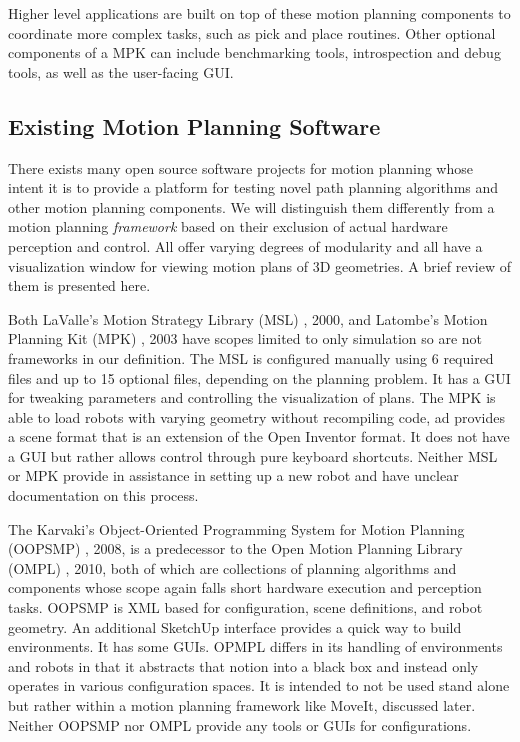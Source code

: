 \documentclass[10pt,journal,compsoc]{joser1}
\begin{document}
{Higher level applications are built on top of these motion planning components to coordinate more complex tasks, such as pick and place routines. Other optional components of a MPK can include benchmarking tools, introspection and debug tools, as well as the user-facing GUI.

\subsection{Existing Motion Planning Software}
\label{sec::existing}

There exists many open source software projects for motion planning whose intent it is to provide a platform for testing novel path planning algorithms and other motion planning components. We will distinguish them differently from a motion planning \textit{framework} based on their exclusion of actual hardware perception and control. All offer varying degrees of modularity and all have a visualization window for viewing motion plans of 3D geometries. A brief review of them is presented here.

Both LaValle's Motion Strategy Library (MSL) \cite{lavallemsl}, 2000, and Latombe's Motion Planning Kit (MPK) \cite{}, 2003 have scopes limited to only simulation so are not frameworks in our definition. The MSL is configured manually using 6 required files and up to 15 optional files, depending on the planning problem. It has a GUI for tweaking parameters and controlling the visualization of plans. The MPK is able to load robots with varying geometry without recompiling code, ad provides a scene format that is an extension of the Open Inventor format. It does not have a GUI but rather allows control through pure keyboard shortcuts. Neither MSL or MPK provide in assistance in setting up a new robot and have unclear documentation on this process.

The Karvaki's Object-Oriented Programming System for Motion Planning (OOPSMP) \cite{}, 2008, is a predecessor to the Open Motion Planning Library (OMPL) \cite{}, 2010, both of which are collections of planning algorithms and components whose scope again falls short hardware execution and perception tasks. OOPSMP is XML based for configuration, scene definitions, and robot geometry. An additional SketchUp interface provides a quick way to build environments. It has some GUIs. OPMPL differs in its handling of environments and robots in that it abstracts that notion into a black box and instead only operates in various configuration spaces. It is intended to not be used stand alone but rather within a motion planning framework like MoveIt, discussed later. Neither OOPSMP nor OMPL provide any tools or GUIs for configurations.

}
\end{document}
